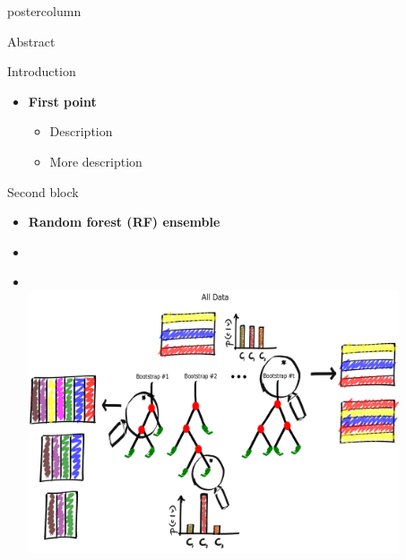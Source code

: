 \documentclass[final]{beamer}
\begin{document}
\begin{frame}
\begin{columns}
\begin{column}{.49\textwidth}
\begin{beamercolorbox}[center,wd=\textwidth]{postercolumn}
\begin{minipage}[T]{.95\textwidth}
{            %
            \begin{block}{Abstract}
              \lipsum[1-2]
            \end{block}
            \vfill
            \begin{block}{Introduction}
              \begin{itemize}
               \item \textbf{\color{orounam}First point }
               \begin{itemize}
               		\item Description 
               		\item More description
               \end{itemize}  
              \end{itemize}
              \lipsum[1]
            \end{block}
            \vfill
            \begin{block}{Second block}
            \begin{itemize}
            	\item \textbf{\color{orounam}Random forest (RF) ensemble}
            	\item []
            	\item []
            	\begin{columns}
            		\begin{column}{.54\textwidth}
            		\\
            			\includegraphics[width = 0.9\textwidth, height = 0.15\textheight]{images/framework/RF_train.png}
            		\end{column}
            		\begin{column}{.44\textwidth}

\end{column}
\end{columns}
\end{itemize}
\end{block}}
\end{minipage}
\end{beamercolorbox}
\end{column}
\end{columns}
\end{frame}
\end{document}
